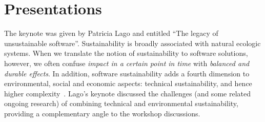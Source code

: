 \documentclass[11pt, oneside]{amsart}
\newcommand{\note}[1]{ {\textcolor{blueish}    { ***Note:      #1 }}}
\begin{document}




\section{Presentations}\label{sec:presentations}


The keynote was given by Patricia Lago and entitled ``The legacy of unsustainable software''.
%
Sustainability is broadly associated with natural ecologic systems. When we translate the notion of sustainability to software solutions, however, we often confuse {\em impact in a certain point in time} with {\em balanced and durable effects}. In addition, software sustainability adds a fourth dimension to environmental, social and economic aspects: technical sustainability, and hence higher complexity~\cite{Lago2015}.  Lago's keynote discussed the challenges (and some related ongoing research) of combining technical and environmental sustainability, providing a complementary angle to the workshop discussions.
\end{document}
